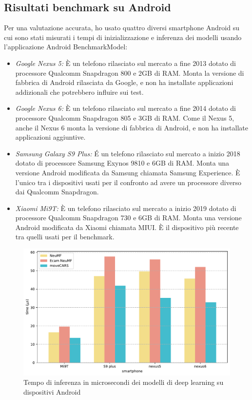 \documentclass[12pt,italian]{report}
\begin{document}
\subsection{Risultati benchmark su Android} \label{sec:benchmark}
\noindent Per una valutazione accurata, ho usato quattro diversi smartphone Android su cui sono stati misurati i tempi di inizializzazione e inferenza dei modelli usando l'applicazione Android BenchmarkModel:
\begin{itemize}
\item \textit{Google Nexus 5:} \`E un telefono rilasciato sul mercato a fine 2013 dotato di processore Qualcomm Snapdragon 800 e 2GB di RAM. Monta la versione di fabbrica di Android rilasciata da Google, e non ha installate applicazioni addizionali che potrebbero influire sui test.

\item \textit{Google Nexus 6:} \`E un telefono rilasciato sul mercato a fine 2014 dotato di processore Qualcomm Snapdragon 805 e 3GB di RAM. Come il Nexus 5, anche il Nexus 6 monta la versione di fabbrica di Android, e non ha installate applicazioni aggiuntive.

\item \textit{Samsung Galaxy S9 Plus:} \'E un telefono rilasciato sul mercato a inizio 2018 dotato di processore Samsung Exynos 9810 e 6GB di RAM. Monta una versione Android modificata da Samsung chiamata Samsung Experience. \`E l'unico tra i dispositivi usati per il confronto ad avere un processore diverso dai Qualcomm Snapdragon.

\item \textit{Xiaomi Mi9T:} \`E un telefono rilasciato sul mercato a inizio 2019 dotato di processore Qualcomm Snapdragon 730  e 6GB di RAM. Monta una versione Android modificata da Xiaomi chiamata MIUI. \`E il dispositivo più recente tra quelli usati per il benchmark.
\end{itemize}

\begin{figure}
  \centering
  \includegraphics[width=\linewidth]{immagini/inference_tflite.pdf}
  \caption{Tempo di inferenza in microsecondi dei modelli di deep learning su dispositivi Android}
  \label{fig:inference-time}
\end{figure} 
\end{document}
